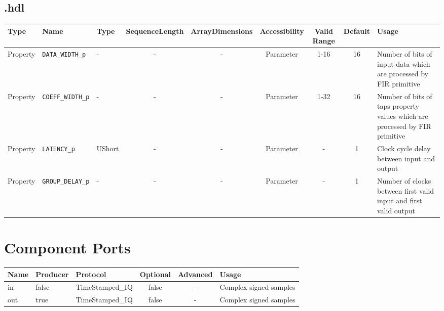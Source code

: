\begin{landscape}
	\subsection*{\comp.hdl}
	\begin{scriptsize}
		\begin{tabular}{|p{3cm}|p{2cm}|p{1cm}|c|c|c|c|c|p{5cm}|}
			\hline
			\rowcolor{blue}
			Type     & Name                 & Type  	& SequenceLength & ArrayDimensions & Accessibility	& Valid Range & Default & Usage                                        \\
			\hline
			Property & \verb+DATA_WIDTH_p+  & -     	& -              & -               & Parameter		& 1-16        & 16      & Number of bits of input data which are processed by FIR primitive \\
			\hline
			Property & \verb+COEFF_WIDTH_p+ & -	 	& -              & -               & Parameter		& 1-32        & 16      & Number of bits of taps property values which are processed by FIR primitive\\
			\hline
			Property & \verb+LATENCY_p+ 	 & UShort	& -              & -               & Parameter		& -           & 1       & Clock cycle delay between input and output   \\
			\hline
			Property & \verb+GROUP_DELAY_p+ & -		& -              & -               & Parameter		& -           & 1       & Number of clocks between first valid input and first valid output\\
			\hline
		\end{tabular}
	\end{scriptsize}


	\section*{Component Ports}
	\begin{scriptsize}
		\begin{tabular}{|M{2cm}|M{1.5cm}|M{4cm}|c|c|M{9cm}|}
			\hline
			\rowcolor{blue}
			Name & Producer & Protocol           	& Optional & Advanced & Usage                  \\
			\hline
			in   & false    & TimeStamped\_IQ		& false    & -        & Complex signed samples \\
			\hline
			out  & true     & TimeStamped\_IQ		& false    & -        & Complex signed samples \\
			\hline
		\end{tabular}
	\end{scriptsize}


\end{landscape}
